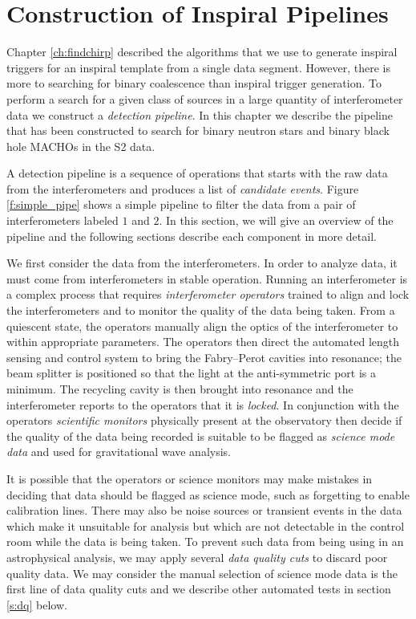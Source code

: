 
\section{Construction of Inspiral Pipelines}
\label{s:construction}

Chapter \ref{ch:findchirp} described the algorithms that we use to generate
inspiral triggers for an inspiral template from a single data segment.
However, there is more to searching for binary coalescence than inspiral
trigger generation. To perform a search for a given class of sources in a
large quantity of interferometer data we construct a \emph{detection
pipeline}. In this chapter we describe the pipeline that has been constructed
to search for binary neutron stars and binary black hole MACHOs in the S2
data.

A detection pipeline is a sequence of operations that starts with the raw data
from the interferometers and produces a list of \emph{candidate events}.
Figure \ref{f:simple_pipe} shows a simple pipeline to filter the data from a
pair of interferometers labeled $1$ and $2$. In this section, we will give an
overview of the pipeline and the following sections describe each component in
more detail. 

We first consider the data from the interferometers. In order to analyze
data, it must come from interferometers in stable operation. Running an
interferometer is a complex process that requires \emph{interferometer
operators} trained to align and lock the interferometers and to monitor the
quality of the data being taken. From a quiescent state, the operators
manually align the optics of the interferometer to within appropriate
parameters. The operators then direct the automated length sensing and control
system to bring the Fabry--Perot cavities into resonance; the beam splitter
is positioned so that the light at the anti-symmetric port is a minimum. The
recycling cavity is then brought into resonance and the interferometer reports
to the operators that it is \emph{locked}.  In conjunction with the operators
\emph{scientific monitors} physically present at the observatory then decide if
the quality of the data being recorded is suitable to be flagged as
\emph{science mode data} and used for gravitational wave analysis.

It is possible that the operators or science monitors may make mistakes in
deciding that data should be flagged as science mode, such as forgetting to
enable calibration lines. There may also be noise sources or transient events
in the data which make it unsuitable for analysis but which are not detectable
in the control room while the data is being taken. To prevent such data from
being using in an astrophysical analysis, we may apply several \emph{data
quality cuts} to discard poor quality data. We may consider the manual
selection of science mode data is the first line of data quality cuts and we
describe other automated tests in section \ref{s:dq} below.

